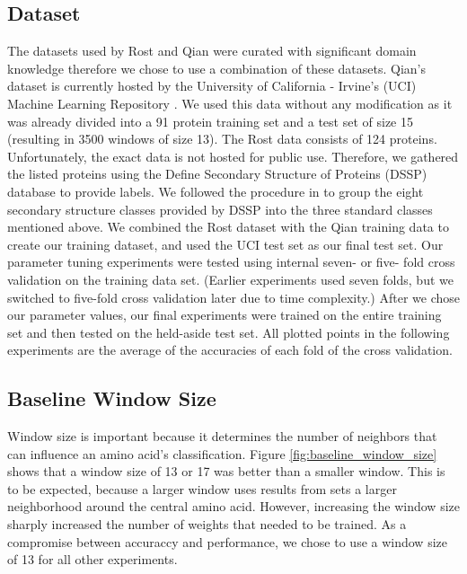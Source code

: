 \documentclass[letterpaper,twocolumn,12pt]{article}
\begin{document}
\subsection{Dataset}
The datasets used by Rost and Qian were curated with significant domain knowledge therefore we chose to use a combination of these datasets.
Qian's dataset is currently hosted by the University of California - Irvine's (UCI) Machine Learning Repository \cite{uci}.
We used this data without any modification as it was already divided into a 91 protein training set and a test set of size 15 (resulting in 3500 windows of size 13).
The Rost data consists of 124 proteins.
Unfortunately, the exact data is not hosted for public use.
Therefore, we gathered the listed proteins using the Define Secondary Structure of Proteins (DSSP) database \cite{DSSP} \cite{DSSP2} to provide labels.
We followed the procedure in \cite{Rost} to group the eight secondary structure classes provided by DSSP into the three standard classes mentioned above.
We combined the Rost dataset with the Qian training data to create our training dataset, and used the UCI test set as our final test set.
Our parameter tuning experiments were tested using internal seven- or five- fold cross validation on the training data set.
(Earlier experiments used seven folds, but we switched to five-fold cross validation later due to time complexity.)
After we chose our parameter values, our final experiments were trained on the entire training set and then tested on the held-aside test set.
All plotted points in the following experiments are the average of the accuracies of each fold of the cross validation.

\subsection{Baseline Window Size}
Window size is important because it determines the number of neighbors that can influence an amino acid's classification.
Figure \ref{fig:baseline_window_size} shows that a window size of 13 or 17 was better than a smaller window.
This is to be expected, because a larger window uses results from sets a larger neighborhood around the central amino acid.
However, increasing the window size sharply increased the number of weights that needed to be trained.
As a compromise between accuraccy and performance, we chose to use a window size of 13 for all other experiments.
\end{document}
